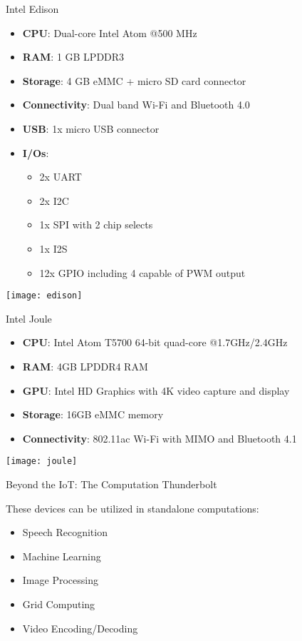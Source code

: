 \begin{frame}{Intel Edison}

\begin{multicols}{2}

\footnotesize
\begin{itemize}
    \item
    \textbf{CPU}: Dual-core Intel Atom @500 MHz
    \item
\textbf{RAM}: 1 GB LPDDR3 
\item
\textbf{Storage}: 4 GB eMMC + micro SD card connector
\item
\textbf{Connectivity}:  Dual band Wi-Fi and Bluetooth 4.0
\item
\textbf{USB}: 1x micro USB connector
\item
\textbf{I/Os}:
\footnotesize
\begin{itemize}
    \item
2x UART  
\item
2x I2C 
\item
1x SPI with 2 chip selects
\item
1x I2S
\item
12x GPIO including 4 capable of PWM output
\end{itemize}
\end{itemize}

\end{multicols}

\centering
\texttt{[image: edison]}

\end{frame}




\begin{frame}{Intel Joule}

\begin{itemize}
    \item
    \textbf{CPU}: Intel Atom T5700 64-bit quad-core @1.7GHz/2.4GHz
    \item
\textbf{RAM}: 4GB LPDDR4 RAM
\item
\textbf{GPU}: Intel HD Graphics with 4K video capture and display
\item
\textbf{Storage}: 16GB eMMC memory
\item
\textbf{Connectivity}: 802.11ac Wi-Fi with MIMO and Bluetooth 4.1
\end{itemize}

\texttt{[image: joule]}


\end{frame}



\begin{frame}{Beyond the IoT: The Computation Thunderbolt }

These devices can be utilized in standalone computations:
\begin{itemize}
    \item Speech Recognition
    \item Machine Learning
    \item Image Processing
    \item Grid Computing
    \item Video Encoding/Decoding
\end{itemize}


\end{frame}